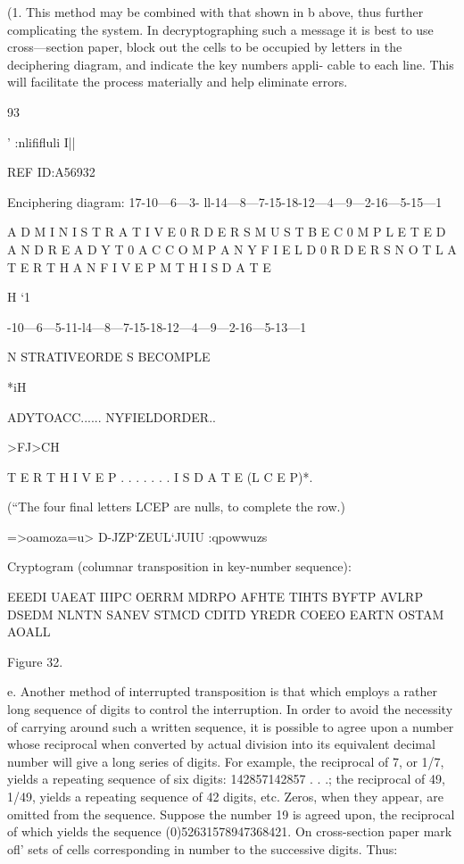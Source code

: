 {(1. This method may be combined with that shown in b above, thus
further complicating the system. In decryptographing such a message it
is best to use cross—section paper, block out the cells to be occupied by
letters in the deciphering diagram, and indicate the key numbers appli-
cable to each line. This will facilitate the process materially and help
eliminate errors.

93

' :nliﬁﬂuli I||

 

REF ID:A56932

Enciphering diagram:
17-10—6—3- ll-14—8—7-15-18-12—4—9—2-16—5-15—1

 

A D M I N I S T R A T I V E 0 R D E
R S M U S T B E C 0 M P L E T E D A
N D R E A D Y T 0 A C C O M P A N Y
F I E L D 0 R D E R S N O T L A T E
R T H A N F I V E P M T H I S D A T
E

H
‘1

-10—6—5-11-l4—8—7-15-18-12—4—9—2-16—5-13—1

N STRATIVEORDE
S BECOMPLE

 

*iH

ADYTOACC......
NYFIELDORDER..

>FJ>CH

T E R T H
I V E P . . . . . . .
I S D A T E (L C E P)*.

(“The four ﬁnal letters LCEP are nulls, to complete the row.)

=>oamoza=u>
D-JZP‘ZEUL‘JUIU
:qpowwuzs

Cryptogram (columnar transposition in key-number sequence):

EEEDI UAEAT IIIPC OERRM MDRPO AFHTE
TIHTS BYFTP AVLRP DSEDM NLNTN SANEV
STMCD CDITD YREDR COEEO EARTN OSTAM
AOALL

Figure 32.

e. Another method of interrupted transposition is that which employs
a rather long sequence of digits to control the interruption. In order
to avoid the necessity of carrying around such a written sequence, it
is possible to agree upon a number whose reciprocal when converted
by actual division into its equivalent decimal number will give a long
series of digits. For example, the reciprocal of 7, or 1/7, yields a
repeating sequence of six digits: 142857142857 . . .; the reciprocal
of 49, 1/49, yields a repeating sequence of 42 digits, etc. Zeros, when they
appear, are omitted from the sequence. Suppose the number 19 is agreed
upon, the reciprocal of which yields the sequence (0)52631578947368421.
On cross-section paper mark oﬂ' sets of cells corresponding in number
to the successive digits. Thus:

}
